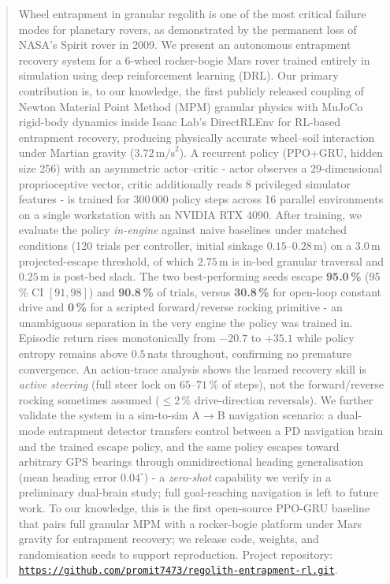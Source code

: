 \documentclass[conference]{IEEEtran}
\begin{document}
\begin{abstract}
Wheel entrapment in granular regolith is one of the most critical failure modes
for planetary rovers, as demonstrated by the permanent loss of NASA's Spirit rover
in 2009. We present an autonomous entrapment recovery system for a 6-wheel
rocker-bogie Mars rover trained entirely in simulation using deep reinforcement
learning (DRL). Our primary contribution is, to our knowledge, the first
publicly released coupling of Newton Material
Point Method (MPM) granular physics with MuJoCo rigid-body dynamics inside Isaac
Lab's DirectRLEnv for RL-based entrapment recovery, producing physically accurate
wheel--soil interaction under Martian gravity ($3.72\,\text{m/s}^2$). A recurrent
policy (PPO+GRU, hidden size 256) with an asymmetric actor--critic - actor
observes a 29-dimensional proprioceptive vector, critic additionally reads 8
privileged simulator features - is trained for 300\,000 policy steps across 16
parallel environments on a single workstation with an NVIDIA RTX 4090. After
training, we evaluate the policy \emph{in-engine} against naive baselines under
matched conditions (120 trials per controller, initial sinkage
$0.15$--$0.28$\,m) on a $3.0$\,m projected-escape threshold, of which $2.75$\,m
is in-bed granular traversal and $0.25$\,m is post-bed slack. The two
best-performing seeds escape \textbf{95.0\,\%} (95\,\% CI $[91,98]$) and
\textbf{90.8\,\%} of trials, versus \textbf{30.8\,\%} for open-loop constant
drive and \textbf{0\,\%} for a scripted forward/reverse rocking primitive - an
unambiguous separation in the very engine the policy was trained in. Episodic
return rises monotonically from $-20.7$ to $+35.1$ while policy entropy remains
above $0.5$\,nats throughout, confirming no premature convergence. An
action-trace analysis shows the learned recovery skill is \emph{active steering}
(full steer lock on $65$--$71\,\%$ of steps), not the forward/reverse rocking
sometimes assumed ($\leq 2\,\%$ drive-direction reversals). We further validate
the system in a sim-to-sim A$\to$B navigation scenario: a dual-mode entrapment
detector transfers control between a PD navigation brain and the trained escape
policy, and the same policy escapes toward arbitrary GPS bearings through
omnidirectional heading generalisation (mean heading error $0.04^\circ$) - a
\emph{zero-shot} capability we verify in a preliminary dual-brain study;
full goal-reaching navigation is left to future work. To our knowledge, this is
the first
open-source PPO-GRU baseline that pairs full granular MPM with a rocker-bogie
platform under Mars gravity for entrapment recovery; we release code, weights,
and randomisation seeds to support reproduction. Project repository:
\href{https://github.com/promit7473/regolith-entrapment-rl.git}{\textcolor{nvgreen}{\nolinkurl{https://github.com/promit7473/regolith-entrapment-rl.git}}}.
\end{abstract}
\end{document}
